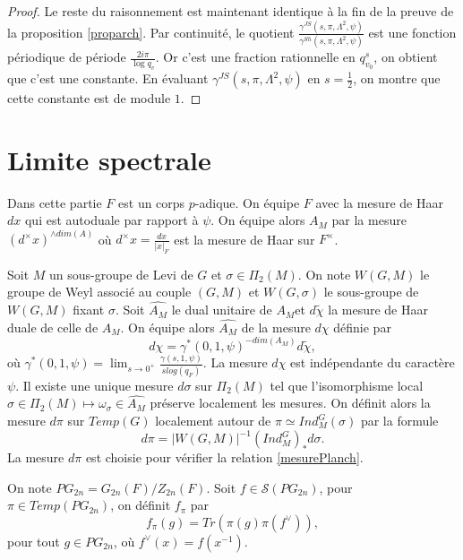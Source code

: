 \documentclass{amsart}
\begin{document}
\begin{proof}
 Le reste du raisonnement est maintenant identique à la fin de la preuve de la proposition \ref{proparch}. Par continuité, le quotient $\frac{\gamma^{JS}(s, \pi, \Lambda^2, \psi)}{\gamma^{Sh}(s, \pi, \Lambda^2, \psi)}$ est une fonction périodique de période $\frac{2i\pi}{\log q_v}$. Or c'est une fraction rationnelle en $q_{v_0}^s$, on obtient que c'est une constante. En évaluant $\gamma^{JS}(s, \pi, \Lambda^2, \psi)$ en $s=\frac{1}{2}$, on montre que cette constante est de module $1$.
 \end{proof}
 
 
 
 \section{Limite spectrale}
 
 \label{seclimite}
 Dans cette partie $F$ est un corps $p$-adique. On équipe $F$ avec la mesure de Haar $dx$ qui est autoduale par rapport à $\psi$. On équipe alors $A_M$ par la mesure $(d^\times x)^{\wedge dim(A)}$ où $d^\times x = \frac{dx}{|x|_F}$ est la mesure de Haar sur $F^\times$.

Soit $M$ un sous-groupe de Levi de $G$ et $\sigma \in \Pi_2(M)$. On note $W(G, M)$ le groupe de Weyl associé au couple $(G,M)$ et $W(G, \sigma)$ le sous-groupe de $W(G, M)$ fixant $\sigma$. Soit $\widehat{A_M}$ le dual unitaire de $A_M$et $d\widetilde{\chi}$ la mesure de Haar duale de celle de $A_M$. On équipe alors $\widehat{A_M}$ de la mesure $d\chi$ définie par
\begin{equation}
d\chi = \gamma^*(0, 1, \psi)^{-dim(A_M)}d\widetilde{\chi},
\end{equation}
où $\gamma^*(0, 1, \psi) = \lim_{s \rightarrow 0^+} \frac{\gamma(s, 1, \psi)}{s log(q_F)}$. La mesure $d\chi$ est indépendante du caractère $\psi$. Il existe une unique mesure $d\sigma$ sur $\Pi_2(M)$ tel que l'isomorphisme local $\sigma \in \Pi_2(M) \mapsto \omega_{\sigma} \in \widehat{A_M}$ préserve localement les mesures. On définit alors la mesure $d\pi$ sur $Temp(G)$ localement autour de $\pi \simeq Ind_M^G(\sigma)$ par la formule
\begin{equation}
d\pi  = |W(G, M)|^{-1} (Ind_M^G)_* d\sigma.
\end{equation}
La mesure $d\pi$ est choisie pour vérifier la relation \ref{mesurePlanch}.

On note $PG_{2n} = G_{2n}(F)/Z_{2n}(F)$. Soit $f \in \mathcal{S}(PG_{2n})$, pour $\pi \in Temp(PG_{2n})$, on définit $f_\pi$ par
\begin{equation}
f_\pi(g) = Tr(\pi(g)\pi(f^\vee)),
\end{equation}
pour tout $g \in PG_{2n}$, où $f^{\vee}(x) = f(x^{-1})$.
\end{document}
